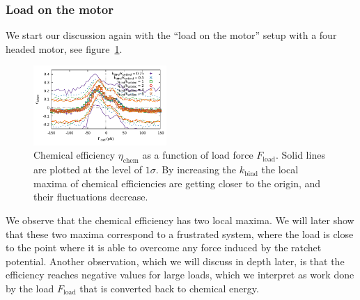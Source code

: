 \documentclass[aps,pre,twocolumn,showpacs,showkeys,superscriptaddress,floatfix]{revtex4-1}
\begin{document}
\subsubsection{Load on the motor}
We start our discussion again with the ``load on the motor'' setup with a four headed motor, see figure~\ref{fig:chem}.
\begin{figure}[t]
\centering
\includegraphics[width=0.45\textwidth,height=!]{chemical_cycle}
\caption{
\label{fig:chem}
Chemical efficiency $\eta_\text{chem}$ as a function of load force $F_\text{load}$.
Solid lines are plotted at the level of $1\sigma$. 
By increasing the $k_\text{bind}$ the local maxima of chemical efficiencies are getting closer to the origin,
and their fluctuations decrease. 
}
\end{figure}
We observe that the chemical efficiency has two local maxima. 
We will later show that these two maxima correspond to a frustrated system, 
where the load is close to the point where it is able to overcome any force induced by the ratchet potential. 
Another observation, which we will discuss in depth later, is that the efficiency reaches negative values for large loads, 
which we interpret as work done by the load $F_\text{load}$ that is converted back to chemical energy. 
\end{document}
